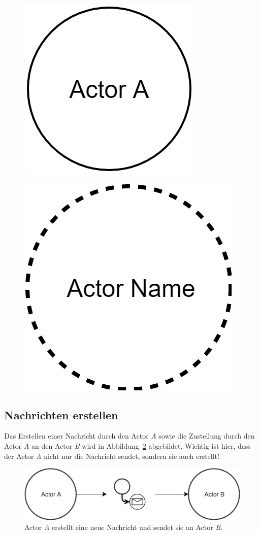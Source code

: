 \begin{figure}
    \centering
    \begin{minipage}{.5\textwidth}
      \centering
      \includegraphics[width=.5\linewidth]{gfx/actor/longLiveActor}
      \label{fig:test1}
    \end{minipage}%
    \begin{minipage}{.5\textwidth}
      \centering
      \includegraphics[width=.5\linewidth]{gfx/actor/shortLiveActor}
      \label{fig:test2}
    \end{minipage}
\end{figure}  

\subsection{Nachrichten erstellen}
Das Erstellen einer Nachricht durch den Actor \textit{A} sowie die Zustellung durch den Actor \textit{A} an den Actor \textit{B} wird in Abbildung~\ref{fig:actor:diagram:simpleCreateAndSendMessage} abgebildet. Wichtig ist hier, dass der Actor \textit{A} nicht nur die Nachricht sendet, sondern sie auch erstellt!
\begin{figure}
    \centering
    \includegraphics[width=\linewidth]{gfx/actor/simpleCreateAndSendMessage}
    \caption{Actor \textit{A} erstellt eine neue Nachricht und sendet sie an Actor \textit{B}.}
    \label{fig:actor:diagram:simpleCreateAndSendMessage}
\end{figure}

